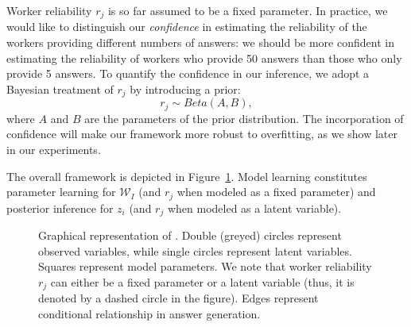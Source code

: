 Worker reliability $r_j$ is so far assumed to be a fixed parameter. In practice, we would like to distinguish our \emph{confidence} in estimating the reliability of the workers providing different numbers of answers: we should be more confident in estimating the reliability of workers who provide 50 answers than those who only provide 5 answers. To quantify the confidence in our inference, we adopt a Bayesian treatment of $r_j$ by introducing a prior:
%
\begin{equation}
        r_j \sim Beta(A,B),
        \label{eq:rj_dist}
\end{equation}
%
where $A$ and $B$ are the parameters of the prior distribution. The incorporation of confidence will make our framework more robust to overfitting, as we show later in our experiments. 

The overall \sys framework is depicted in Figure~\ref{fig:graphical_model}. Model learning constitutes parameter learning for $\mathcal{W}_I$ (and $r_j$ when modeled as a fixed parameter) and posterior inference for $z_i$ (and $r_j$ when modeled as a latent variable).  

\begin{figure}[htb] 
{
}
\caption{Graphical representation of \sys. Double (greyed) circles represent observed variables, while single circles represent latent variables.  Squares represent model parameters. We note that worker reliability $r_j$ can either be a fixed parameter or a latent variable (thus, it is denoted by a dashed circle in the figure). Edges represent conditional relationship in answer generation.}
\label{fig:graphical_model}
\end{figure}


